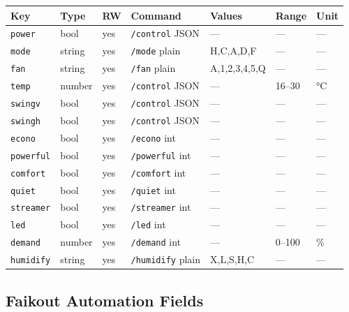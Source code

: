 \documentclass[11pt,a4paper]{article}
\newcommand{\field}[1]{\texttt{\color{codegreen}#1}}
\begin{document}
\begin{tabularx}{\textwidth}{@{}lllXlll@{}}
\toprule
\textbf{Key} & \textbf{Type} & \textbf{RW} & \textbf{Command} & \textbf{Values} & \textbf{Range} & \textbf{Unit} \\
\midrule
\rowcolor{lightbg}
\field{power}    & bool   & yes & \texttt{/control} JSON  & —               & —       & — \\
\field{mode}     & string & yes & \texttt{/mode} plain    & H,C,A,D,F       & —       & — \\
\rowcolor{lightbg}
\field{fan}      & string & yes & \texttt{/fan} plain     & A,1,2,3,4,5,Q   & —       & — \\
\field{temp}     & number & yes & \texttt{/control} JSON  & —               & 16–30   & °C \\
\rowcolor{lightbg}
\field{swingv}   & bool   & yes & \texttt{/control} JSON  & —               & —       & — \\
\field{swingh}   & bool   & yes & \texttt{/control} JSON  & —               & —       & — \\
\rowcolor{lightbg}
\field{econo}    & bool   & yes & \texttt{/econo} int     & —               & —       & — \\
\field{powerful} & bool   & yes & \texttt{/powerful} int  & —               & —       & — \\
\rowcolor{lightbg}
\field{comfort}  & bool   & yes & \texttt{/comfort} int   & —               & —       & — \\
\field{quiet}    & bool   & yes & \texttt{/quiet} int     & —               & —       & — \\
\rowcolor{lightbg}
\field{streamer} & bool   & yes & \texttt{/streamer} int  & —               & —       & — \\
\field{led}      & bool   & yes & \texttt{/led} int       & —               & —       & — \\
\rowcolor{lightbg}
\field{demand}   & number & yes & \texttt{/demand} int    & —               & 0–100   & \% \\
\field{humidify} & string & yes & \texttt{/humidify} plain& X,L,S,H,C       & —       & — \\
\bottomrule
\end{tabularx}

\subsection{Faikout Automation Fields}
\end{document}
